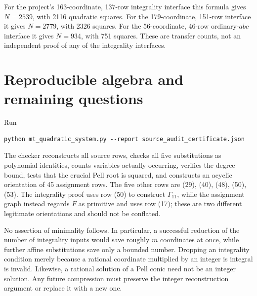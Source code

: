 \documentclass[11pt]{article}
\begin{document}
For the project's 163-coordinate, 137-row integrality interface this
formula gives \(N=2539\), with 2116 quadratic squares. For the
179-coordinate, 151-row interface it gives \(N=2779\), with 2326
squares. For the 56-coordinate, 46-row ordinary-\(abc\) interface it
gives \(N=934\), with 751 squares. These are transfer counts, not an
independent proof of any of the integrality interfaces.

\section{Reproducible algebra and remaining questions}
Run
\begin{verbatim}
python mt_quadratic_system.py --report source_audit_certificate.json
\end{verbatim}
The checker reconstructs all source rows, checks all five substitutions
as polynomial identities, counts variables actually occurring, verifies
the degree bound, tests that the crucial Pell root is squared, and
constructs an acyclic orientation of 45 assignment rows. The five other
rows are (29), (40), (48), (50), (53). The integrality proof uses row (50)
to construct \(\Gamma_{11}\), while the assignment graph instead regards
\(F\) as primitive and uses row (17); these are two different legitimate
orientations and should not be conflated.

No assertion of minimality follows. In particular, a successful reduction
of the number of integrality inputs would save roughly \(m\) coordinates
at once, while further affine substitutions save only a bounded number.
Dropping an integrality condition merely because a rational coordinate
multiplied by an integer is integral is invalid. Likewise, a rational
solution of a Pell conic need not be an integer solution. Any future
compression must preserve the integer reconstruction argument or replace
it with a new one.
\end{document}
